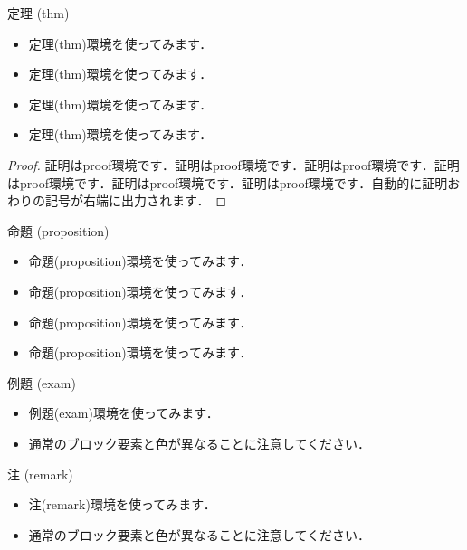 \begin{frame}{定理 (thm)}
  \begin{thm}
    \begin{itemize}
      \item 定理(thm)環境を使ってみます．
      \item 定理(thm)環境を使ってみます．
      \item 定理(thm)環境を使ってみます．
      \item 定理(thm)環境を使ってみます．
    \end{itemize}
  \end{thm}
  \begin{proof}
    証明はproof環境です．証明はproof環境です．証明はproof環境です．証明はproof環境です．証明はproof環境です．証明はproof環境です．自動的に証明おわりの記号が右端に出力されます．
  \end{proof}
\end{frame}

\begin{frame}{命題 (proposition)}
  \begin{proposition}
    \begin{itemize}
      \item 命題(proposition)環境を使ってみます．
      \item 命題(proposition)環境を使ってみます．
      \item 命題(proposition)環境を使ってみます．
      \item 命題(proposition)環境を使ってみます．
    \end{itemize}
  \end{proposition}
\end{frame}

\begin{frame}{例題 (exam)}
  \begin{exam}
    \begin{itemize}
      \item 例題(exam)環境を使ってみます．
      \item 通常のブロック要素と色が異なることに注意してください．
    \end{itemize}
  \end{exam}
\end{frame}

\begin{frame}{注 (remark)}
  \begin{remark}
    \begin{itemize}
      \item 注(remark)環境を使ってみます．
      \item 通常のブロック要素と色が異なることに注意してください．
    \end{itemize}
  \end{remark}
\end{frame}

